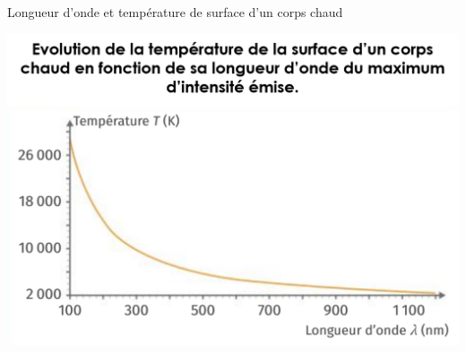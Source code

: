     \begin{doc}{Longueur d'onde et température de surface d'un corps chaud}
    \begin{center}
        \includegraphics[scale=0.7]{Images/TemperaturevsLongueurdonde.PNG}
    \end{center}
    \end{doc}

